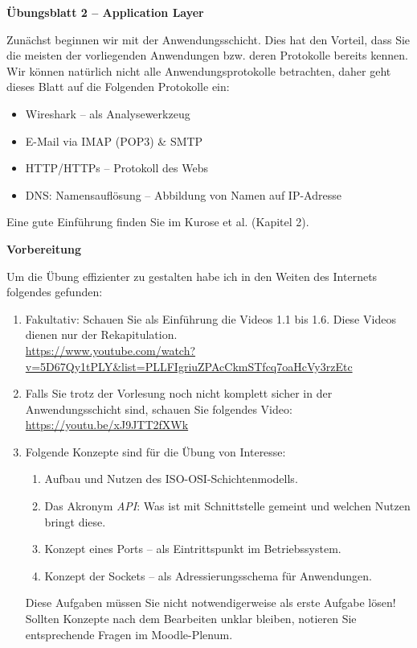 \documentclass[paper=a4,fontsize=11pt]{scrartcl}%
\numberwithin{equation}{section}
\begin{document}
\begin{center}
\Large{\textbf{Übungsblatt 2 -- Application Layer}}
\end{center}
Zunächst beginnen wir mit der Anwendungsschicht. Dies hat den Vorteil, dass Sie die meisten der vorliegenden Anwendungen bzw. deren Protokolle bereits kennen. Wir können natürlich nicht alle Anwendungsprotokolle betrachten, daher geht dieses Blatt auf die Folgenden Protokolle ein:
\begin{itemize}
	\item Wireshark -- als Analysewerkzeug
	\item E-Mail via IMAP (POP3) \& SMTP
	\item HTTP/HTTPs -- Protokoll des Webs
	\item DNS: Namensauflösung -- Abbildung von Namen auf IP-Adresse
\end{itemize}
Eine gute Einführung finden Sie im Kurose et al. \cite[S. 83]{Kurose2012} (Kapitel 2).
\begin{center}\Large{\textbf{Vorbereitung}}\end{center}\vskip0.25in
Um die Übung effizienter zu gestalten habe ich in den Weiten des Internets folgendes gefunden:\\
\begin{enumerate}
	\item Fakultativ: Schauen Sie als Einführung die Videos 1.1 bis 1.6. Diese Videos dienen nur der Rekapitulation.\\
	\url{https://www.youtube.com/watch?v=5D67Qy1tPLY&list=PLLFIgriuZPAcCkmSTfcq7oaHcVy3rzEtc}
	\item Falls Sie trotz der Vorlesung noch nicht komplett sicher in der Anwendungsschicht sind, schauen Sie folgendes Video:
	\url{https://youtu.be/xJ9JTT2fXWk}
	\item Folgende Konzepte sind für die Übung von Interesse:
	\begin{enumerate}
		\item Aufbau und Nutzen des ISO-OSI-Schichtenmodells.
		\item Das Akronym \emph{API}: Was ist mit Schnittstelle gemeint und welchen Nutzen bringt diese.
		\item Konzept eines Ports -- als Eintrittspunkt im Betriebssystem.
		\item Konzept der Sockets -- als Adressierungsschema für Anwendungen.
	\end{enumerate}
	Diese Aufgaben müssen Sie nicht notwendigerweise als erste Aufgabe lösen! Sollten Konzepte nach dem Bearbeiten unklar bleiben, notieren Sie entsprechende Fragen im Moodle-Plenum.
\end{enumerate}
\end{document}
